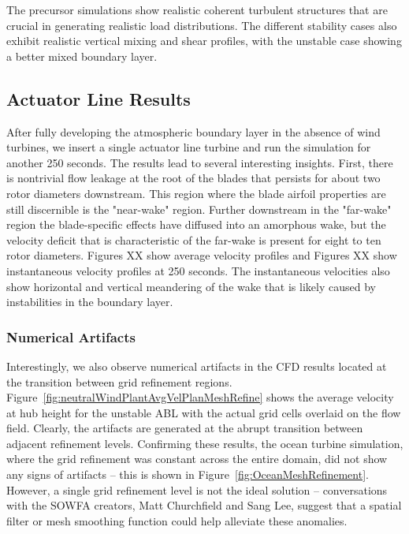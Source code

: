 The precursor simulations show realistic coherent turbulent structures that are crucial in generating realistic load distributions.  The different stability cases also exhibit realistic vertical mixing and shear profiles, with the unstable case showing a better mixed boundary layer.

\subsection{Actuator Line Results}
After fully developing the atmospheric boundary layer in the absence of wind turbines, we insert a single actuator line turbine and run the simulation for another 250 seconds.  The results lead to several interesting insights.  First, there is nontrivial flow leakage at the root of the blades that persists for about two rotor diameters downstream.  This region where the blade airfoil properties are still discernible is the "near-wake" region\cite{sanderse_review_2011}.  Further downstream in the "far-wake" region the blade-specific effects have diffused into an amorphous wake, but the velocity deficit that is characteristic of the far-wake is present for eight to ten rotor diameters.  Figures XX show average velocity profiles and Figures XX show instantaneous velocity profiles at 250 seconds.  The instantaneous velocities also show horizontal and vertical meandering of the wake that is likely caused by instabilities in the boundary layer.

\subsubsection{Numerical Artifacts}
Interestingly, we also observe numerical artifacts in the CFD results located at the transition between grid refinement regions.  Figure~\ref{fig:neutralWindPlantAvgVelPlanMeshRefine} shows the average velocity at hub height for the unstable ABL with the actual grid cells overlaid on the flow field.  Clearly, the artifacts are generated at the abrupt transition between adjacent refinement levels.   Confirming these results, the ocean turbine simulation, where the grid refinement was constant across the entire domain, did not show any signs of artifacts -- this is shown in Figure~\ref{fig:OceanMeshRefinement}. However, a single grid refinement level is not the ideal solution -- conversations with the SOWFA creators, Matt Churchfield and Sang Lee, suggest that a spatial filter or mesh smoothing function could help alleviate these anomalies.

